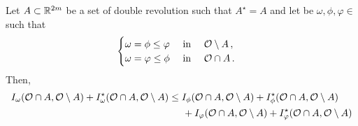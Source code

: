 \begin{lemma}
\label{Lemma: InteractionInequalityMinimumFunction}
Let $A\subset\mathbb{R}^{2m}$ be a set of double revolution such that $A^\star = A$ and let be $\omega, \phi, \varphi \in $ such that
$$\begin{cases}
\omega = \phi \leq \varphi \ \ \ \ \textrm{in } \ \ \ \mathcal{O} \setminus A\,,\\
\omega = \varphi \leq \phi \ \ \ \ \textrm{in } \ \ \ \mathcal{O} \cap A\,.
\end{cases}$$
Then,
\begin{align*}
I_\omega(\mathcal{O}\cap A, \mathcal{O} \setminus A) + I_\omega^\star(\mathcal{O}\cap A, \mathcal{O} \setminus A) &\leq I_\phi(\mathcal{O}\cap A, \mathcal{O} \setminus A) + I_\phi^\star(\mathcal{O}\cap A, \mathcal{O} \setminus A)\\
&\hspace{5mm} + I_\varphi(\mathcal{O}\cap A, \mathcal{O} \setminus A) + I_\varphi^\star(\mathcal{O}\cap A, \mathcal{O} \setminus A)
\end{align*}
\end{lemma}

